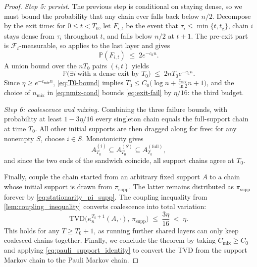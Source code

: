 \documentclass[
    aps,
    superscriptaddress,
    onecolumn,
    10pt,
    prx,
    nofootinbib
]{revtex4-2}
\theoremstyle{namedstatement}
\theoremstyle{plain}
\begin{document}
\begin{proof}
\medskip\noindent\emph{Step 5: persist.}
The previous step is conditional on staying dense, so we must bound the probability that any chain ever falls back below $n/2$. Decompose by the exit time: for $0\le t<T_0$, let $F_{i,t}$ be the event that $\tau_i\le\min\{t,t_{\mathrm g}\}$, chain $i$ stays dense from $\tau_i$ throughout $t$, and falls below $n/2$ at $t+1$. The pre-exit part is $\mathcal F_t$-measurable, so  applies to the last layer and gives
\begin{equation}
  \mathbb P(F_{i,t})\;\le\;2e^{-c_{\mathrm d}n}.
\end{equation}
A union bound over the $nT_0$ pairs $(i,t)$ yields
\begin{equation}\label{eq:exit-fail}
  \mathbb P\big(\exists i\ \text{with a dense exit by }T_0\big)\;\le\;2nT_0e^{-c_{\mathrm d}n}.
\end{equation}
Since $\eta\ge e^{-c_{\mathrm{mix}}n}$, \cref{eq:T0-bound} implies
$T_0\le C_0\big(\log n+\tfrac{c_{\mathrm{mix}}}{\ln2}n+1\big)$, and the choice of
$n_{\mathrm{mix}}$ in \cref{eq:nmix-cond} bounds \cref{eq:exit-fail} by $\eta/16$:
the third budget.
 
\medskip\noindent\emph{Step 6: coalescence and mixing.}
Combining the three failure bounds, with probability at least $1-3\eta/16$ every singleton chain equals the full-support chain at time $T_0$. All other initial supports are then dragged along for free: for any nonempty $S$, choose $i\in S$. Monotonicity gives
\begin{equation}
  A_{T_0}^{(i)}\subseteq A_{T_0}^{(S)}\subseteq A_{T_0}^{(\mathrm{full})},
\end{equation}
and since the two ends of the sandwich coincide, all support chains agree at $T_0$.
 
Finally, couple the chain started from an arbitrary fixed support $A$ to a chain whose initial support is drawn from $\pi_\mathrm{supp}$. The latter remains distributed as $\pi_\mathrm{supp}$ forever by \cref{eq:stationarity_pi_supp}. The coupling inequality from \cref{lem:coupling_inequality} converts coalescence into total variation:
\begin{equation}\label{eq:final-TV}
  \mathrm{TVD}\big(\kappa_n^{T_0+1}(A,\cdot),\,\pi_\mathrm{supp}\big)\;\le\;\frac{3\eta}{16}\;<\;\eta.
\end{equation}
This holds for any $T\ge T_0+1$, as running further shared layers can only keep coalesced chains together. Finally, we conclude the theorem by taking $C_{\mathrm{mix}}\ge C_0$ and applying \cref{eq:pauli_support_identity} to convert the TVD from the support Markov chain to the Pauli Markov chain.
\end{proof}
\end{document}
